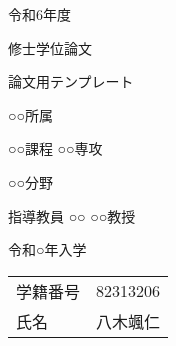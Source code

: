 \documentclass[main]{subfiles}
\begin{document}
\begin{titlepage}
    \fontsize{30pt}{30pt} \selectfont

    \centering
    令和6年度
    \vspace{15pt}

    修士学位論文
    \vspace{45pt}

    論文用テンプレート
    \vspace{45pt}

    ○○所属
    \vspace{20pt}

    ○○課程 ○○専攻
    \vspace{20pt}

    ○○分野
    \vspace{45pt}

    指導教員 ○○ ○○教授
    \vspace{45pt}

    令和○年入学
    \vspace{15pt}

    \begin{tabular}{ll}
        学籍番号 & 82313206 \\
        氏名   & 八木颯仁 \\
    \end{tabular}
    \normalsize

\end{titlepage}
\end{document}
